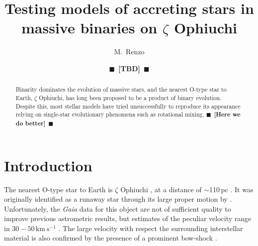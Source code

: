 \documentclass[twocolumn,twocolappendix,trackchanges]{aastex63}
\newcommand{\kms}{{\mathrm{km\ s^{-1}}}}
\newcommand{\todo}[1]{{\large $\blacksquare$~\textbf{\color{red}[#1]}}~$\blacksquare$}
\begin{document}
\title{Testing models of accreting stars in
  massive binaries on $\zeta$ Ophiuchi}
\author[0000-0002-6718-9472]{M.~Renzo}

\author{\todo{TBD}}

\begin{abstract}
  Binarity dominates the evolution of massive stars, and the nearest
  O-type star to Earth, $\zeta$ Ophiuchi, has long been proposed to be
  a product of binary evolution. Despite this, most stellar models
  have tried unsuccessfully to reproduce its appearance relying on
  single-star evolutionary phenomena such as rotational mixing.
  \todo{Here we do better}
\end{abstract}

\vspace*{-10pt}


\section{Introduction}
\label{sec:intro}


The nearest O-type star to Earth is $\zeta$ Ophiuchi \citep[spectral
type O9.5{\rm IVnn},][]{sota:14}, at %
a distance of $\sim$110\,pc \citep[e.g.,][and references
therein]{neuhauser:20}. It was originally identified as a runaway star
through its large proper motion by \cite{blaauw:52}.  Unfortunately,
the \emph{Gaia} data for this object are not of sufficient quality to
improve previous astrometric results, but estimates of the peculiar
velocity range in $30-50\,\kms$
\citep[e.g.,][]{zehe:18, neuhauser:20}. The
large velocity with respect the surrounding interstellar material is
also confirmed by the presence of a prominent bow-shock
\citep[e.g.,][]{bodensteiner:18}.
\end{document}
